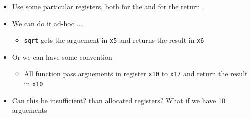 \begin{itemize}
    \item Use some particular registers, both for the  and for the return .
    \item We can do it ad-hoc ...
		\begin{itemize}
		    \item \texttt{sqrt} gets the arguement in \texttt{x5} and returns the result in \texttt{x6}
		\end{itemize}
	\item Or we can have some convention
		\begin{itemize}
		    \item All function pass arguements in register \texttt{x10} to \texttt{x17} and return the result in \texttt{x10}
		\end{itemize}
		\item Can this be insufficient?  than allocated registers? What if we have 10 arguements
\end{itemize}

